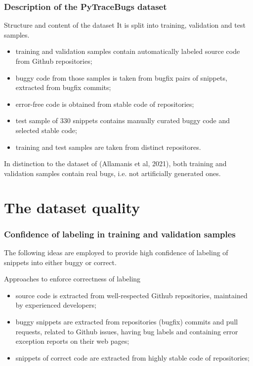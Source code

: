 \documentclass{beamer}
\begin{document}
\begin{frame}
\frametitle{Description of the PyTraceBugs dataset}

{\small
\begin{block}{Structure and content of the dataset}
It is split into training, validation and test samples.
\begin{itemize}
\item training and validation samples contain automatically labeled source code from Github repositories;
\item buggy code from those samples is taken from bugfix pairs of snippets, extracted from bugfix commits;
\item error-free code is obtained from stable code of repositories;
\item test sample of 330 snippets contains manually curated buggy code and selected stable code;
\item training and test samples are taken from distinct repositores.
\end{itemize}
\end{block}

In distinction to the dataset of (Allamanis et al, 2021), both training and validation samples 
contain real bugs, i.e. not artificially generated ones.}
\end{frame}

\section{The dataset quality}

\begin{frame}
\frametitle{Confidence of labeling in training and validation samples}

The following ideas are employed to provide high confidence of labeling of snippets into either buggy or correct.

\begin{block}{Approaches to enforce correctness of labeling}
\begin{itemize}
\item source code is extracted from well-respected Github repositories, maintained by experienced developers;
\item buggy snippets are extracted from repositories (bugfix) commits and pull requests, related to Github issues, having bug labels and containing error exception reports on their web pages;
\item snippets of correct code are extracted from highly stable code of repositories;
\end{itemize}
\end{block}
\end{frame}
\end{document}
